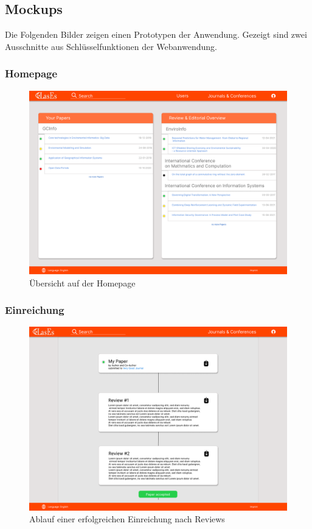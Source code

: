\subsection{Mockups}

Die Folgenden Bilder zeigen einen Prototypen der Anwendung. Gezeigt sind zwei Ausschnitte aus Schlüsselfunktionen der Webanwendung.

\subsubsection{Homepage}

\begin{figure}[H]
	\centering
	\includegraphics[width=\linewidth]{graphics/Homepage}
	\caption{Übersicht auf der Homepage}
\end{figure}

\subsubsection{Einreichung}

\begin{figure}[H]
	\centering
	\includegraphics[width=\linewidth]{graphics/Paper}
	\caption{Ablauf einer erfolgreichen Einreichung nach Reviews}
\end{figure}
